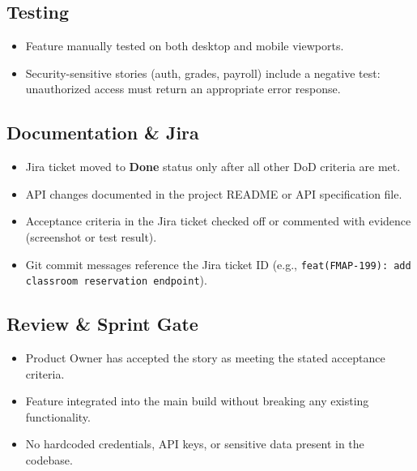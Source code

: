 \documentclass[12pt, a4paper]{article}
\begin{document}
\subsection{Testing}

\begin{tcolorbox}[dodbox]
\begin{itemize}[leftmargin=*,itemsep=3pt,label={$\bullet$}]
\item Feature manually tested on both desktop and mobile viewports.
\item Security-sensitive stories (auth, grades, payroll) include a negative test: unauthorized access must return an appropriate error response.
\end{itemize}
\end{tcolorbox}

\subsection{Documentation \& Jira}

\begin{tcolorbox}[dodbox]
\begin{itemize}[leftmargin=*,itemsep=3pt,label={$\bullet$}]
\item Jira ticket moved to \textbf{Done} status only after all other DoD criteria are met.
\item API changes documented in the project README or API specification file.
\item Acceptance criteria in the Jira ticket checked off or commented with evidence (screenshot or test result).
\item Git commit messages reference the Jira ticket ID (e.g., \texttt{feat(FMAP-199): add classroom reservation endpoint}).
\end{itemize}
\end{tcolorbox}

\subsection{Review \& Sprint Gate}

\begin{tcolorbox}[dodbox]
\begin{itemize}[leftmargin=*,itemsep=3pt,label={$\bullet$}]
\item Product Owner has accepted the story as meeting the stated acceptance criteria.
\item Feature integrated into the main build without breaking any existing functionality.
\item No hardcoded credentials, API keys, or sensitive data present in the codebase.
\end{itemize}
\end{tcolorbox}
\end{document}
